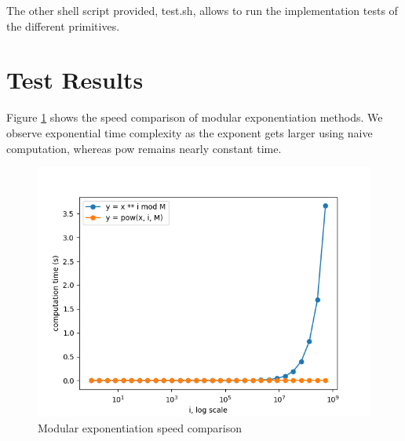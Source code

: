 \documentclass{article}
\begin{document}
The other shell script provided, test.sh, allows to run the implementation tests of the different primitives. 

\section{Test Results}

Figure \ref{fig:pow_speed} shows the speed comparison of modular exponentiation methods. We observe exponential time complexity as the exponent gets larger using naive computation, whereas pow remains nearly constant time.

\begin{figure}[ht]
    \centering
    \includegraphics[scale=0.7]{img/pow_speed.png}
    \caption{Modular exponentiation speed comparison}
    \label{fig:pow_speed}
\end{figure}
\end{document}
